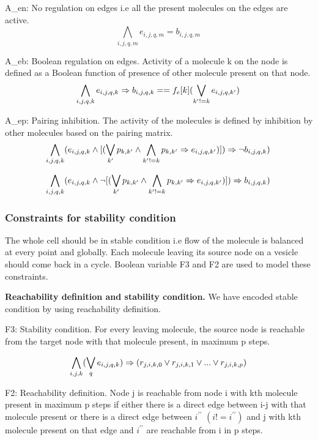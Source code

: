 A\_en: No regulation on edges i.e all the present molecules on the edges are active.
\[ \bigwedge\limits_{i,j,q,m} e_{i,j,q,m} = b_{i,j,q,m} \, \]    

A\_eb: Boolean regulation on edges. Activity of a molecule k on the node is defined as a Boolean function of presence of other molecule present on that node.
\[ \bigwedge\limits_{i,j,q,k} e_{i,j,q,k} \Rightarrow b_{i,j,q,k} == f_e[k](\bigvee_{k' != k} e_{i,j,q,k'}) \, \]  

A\_ep: Pairing inhibition. The activity of the molecules is defined by inhibition by other molecules based on the pairing matrix. 
\[ \bigwedge\limits_{i,j,q, k}  (e_{i,j,q,k} \land [ ( \bigvee_{k'} p_{k,k'} \land \bigwedge_{k' != k} p_{k,k'} \Rightarrow e_{i,j,q,k'})] ) \Rightarrow \neg b_{i,j,q,k}) \, \]  

\[ \bigwedge\limits_{i,j, q, k}  (e_{i,j,q,k} \land \neg [ ( \bigvee_{k'} p_{k,k'} \land \bigwedge_{k' != k} p_{k,k'} \Rightarrow e_{i,j,q,k'})] ) \Rightarrow b_{i,j,q,k}) \, \]  



\subsubsection{Constraints for stability condition}
The whole cell should be in stable condition i.e flow of the molecule is balanced at every point and globally. Each molecule leaving its source node on a vesicle should come back in a cycle. Boolean variable F3 and F2 are used to model these constraints. 

\textbf {Reachability definition and stability condition.}
We have encoded stable condition by using reachability definition. \newline

F3: Stability condition. For every leaving molecule, the source node is reachable from the target node with that molecule present, in maximum p steps. 


\[ \bigwedge\limits_{i,j,k} (\bigvee_{q} e_{i,j,q,k}) \Rightarrow (r_{j,i,k,0}  \lor r_{j,i,k,1} \lor ... \lor r_{j,i,k,p}) \, \]

F2: Reachability definition. Node j is reachable from node i with kth molecule present in maximum p steps if either there is a direct edge between i-j with that molecule present or there is a direct edge between $i^{\prime \prime}$ $(i != i^{\prime \prime})$ and j with kth molecule present on that edge and $i^{\prime \prime}$ are reachable from i in p steps. 

